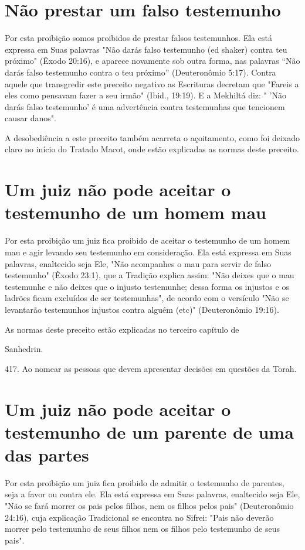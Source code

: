 \section{Não prestar um falso testemunho}

Por esta proibição somos proibidos de prestar falsos testemunhos. Ela
está expressa em Suas palavras "Não darás falso testemunho (ed shaker)
con­tra teu próximo" (Êxodo 20:16), e aparece novamente sob outra forma,
nas pa­lavras ``Não darás falso testemunho contra o teu próximo''
(Deuteronômio 5:17). Contra aquele que transgredir este preceito
negativo as Escrituras decretam que "Fareis a eles como pensavam fazer a
seu irmão" (Ibid., 19:19). E a Mekhiltá diz: " 'Não darás falso
testemunho' é uma advertência contra testemunhas que tencionem causar
danos".

A desobediência a este preceito também acarreta o açoitamento, co­mo foi
deixado claro no início do Tratado Macot, onde estão explicadas as
nor­mas deste preceito.

\section{Um juiz não pode aceitar o testemunho de um homem mau}

Por esta proibição um juiz fica proibido de aceitar o testemunho de um
homem mau e agir levando seu testemunho em consideração. Ela está
expressa em Suas palavras, enaltecido seja Ele, "Não acompanhes o mau
para servir de fal­so testemunho" (Êxodo 23:1), que a Tradição explica
assim: "Não deixes que o mau testemunhe e não deixes que o injusto
testemunhe; dessa forma os injustos e os ladrões ficam excluídos de ser
testemunhas", de acordo com o versículo "Não se levantarão testemunhos
injustos contra alguém (etc)" (Deuteronômio 19:16).


As normas deste preceito estão explicadas no terceiro capítulo de


Sanhedrin.

417. Ao nomear as pessoas que devem apresentar decisões em questões da
Torah.

\section{Um juiz não pode aceitar o testemunho de um parente de uma das partes}

Por esta proibição um juiz fica proibido de admitir o testemunho de
parentes, seja a favor ou contra ele. Ela está expressa em Suas
palavras, enal­tecido seja Ele, "Não se fará morrer os pais pelos
filhos, nem os filhos pelos pais" (Deuteronômio 24:16), cuja explicação
Tradicional se encontra no Sifrei: "Pais não deverão morrer pelo
testemunho de seus filhos nem os filhos pelo testemunho de seus pais".

